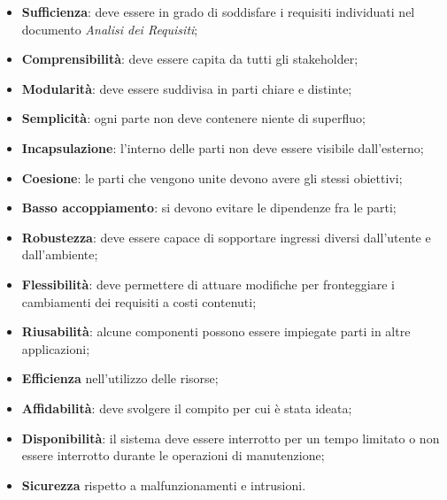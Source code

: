 			\begin{itemize}
				\item \textbf{Sufficienza}: deve essere in grado di soddisfare i requisiti individuati nel documento \textit{Analisi dei Requisiti};
				\item \textbf{Comprensibilità}: deve essere capita da tutti gli stakeholder\glo;
				\item \textbf{Modularità}: deve essere suddivisa in parti chiare e distinte;
				\item \textbf{Semplicità}: ogni parte non deve contenere niente di superfluo;
				\item \textbf{Incapsulazione}: l'interno delle parti non deve essere visibile dall'esterno;
				\item \textbf{Coesione}: le parti che vengono unite devono avere gli stessi obiettivi;
				\item \textbf{Basso accoppiamento}: si devono evitare le dipendenze fra le parti;
				\item \textbf{Robustezza}: deve essere capace di sopportare ingressi diversi dall'utente e dall'ambiente;
				\item \textbf{Flessibilità}: deve permettere di attuare modifiche per fronteggiare i cambiamenti dei requisiti a costi contenuti; 
				\item \textbf{Riusabilità}: alcune componenti possono essere impiegate parti in altre applicazioni;
				\item \textbf{Efficienza} nell'utilizzo delle risorse;
				\item \textbf{Affidabilità}: deve svolgere il compito per cui è stata ideata;
				\item \textbf{Disponibilità}: il sistema deve essere interrotto per un tempo limitato o non essere interrotto durante le operazioni di manutenzione;
				\item \textbf{Sicurezza} rispetto a malfunzionamenti e intrusioni.	
			\end{itemize}
